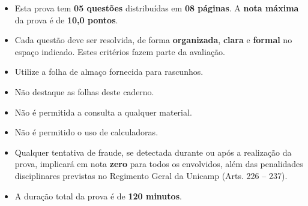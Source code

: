 \documentclass{article}
\begin{document}
\vspace{2cm}


\noindent \hrulefill
\begin{center}
\begin{tcolorbox}[colframe=black,width =7cm,colback=gray!20,arc=0pt]
\end{tcolorbox}
\end{center}

\begin{multicols}{2}
\begin{itemize}
\item Esta prova tem {\bf 05 questões} distribuídas em {\bf 08 páginas}. A {\bf nota máxima} da prova é de {\bf 10,0 pontos}.
\item Cada questão deve ser resolvida, de forma {\bf organizada}, {\bf clara} e {\bf formal} no espaço indicado. Estes critérios fazem parte da avaliação.
\item Utilize a folha de almaço fornecida para rascunhos.
\item Não destaque as folhas deste caderno.
\item Não é permitida a consulta a qualquer material.
\item Não é permitido o uso de calculadoras.
\item Qualquer tentativa de fraude, se detectada durante ou após a realização da prova, implicará em nota {\bf zero} para todos os envolvidos, além das penalidades disciplinares previstas no Regimento Geral da Unicamp (Arts. 226 -- 237).
\item A duração total da prova é de \textbf{120 minutos}.
\end{itemize}
\end{multicols}

\noindent \hrulefill

\pagebreak
\phantom{m} \thispagestyle{empty}

\pagebreak
\end{document}
